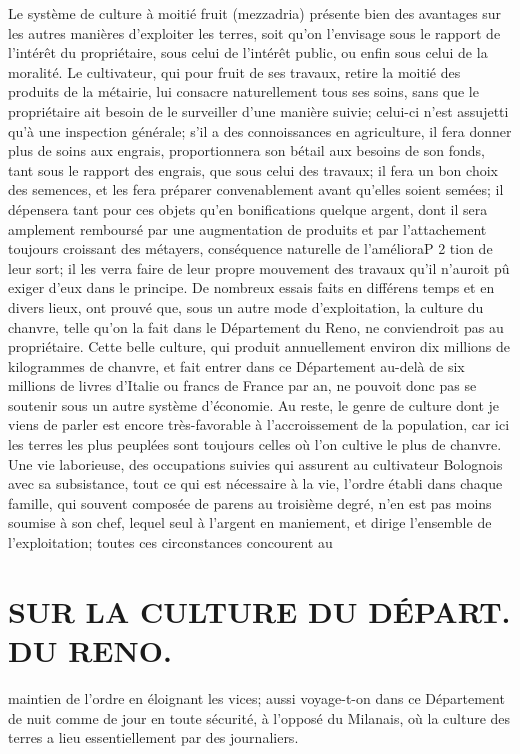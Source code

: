 Le système de culture à moitié fruit (mezzadria) présente bien des avantages sur les autres manières d'exploiter les terres, soit qu'on l'envisage sous le rapport de l'intérêt du propriétaire, sous celui de l'intérêt public, ou enfin sous celui de la moralité.
Le cultivateur, qui pour fruit de ses travaux, retire la moitié des produits de la métairie, lui consacre naturellement tous ses soins, sans que le propriétaire ait besoin de le surveiller d'une manière suivie; celui-ci n'est assujetti qu'à une inspection générale; s'il a des connoissances en agriculture, il fera donner plus de soins aux engrais, proportionnera son bétail aux besoins de son fonds, tant sous le rapport des engrais, que sous celui des travaux; il fera un bon choix des semences, et les fera préparer convenablement avant qu'elles soient semées; il dépensera tant pour ces objets qu'en bonifications quelque argent, dont il sera amplement remboursé par une augmentation de produits et par l'attachement toujours croissant des métayers, conséquence naturelle de l'amélioraP 2\setcounter{page}{180} tion de leur sort; il les verra faire de leur propre mouvement des travaux qu'il n'auroit pû exiger d'eux dans le principe.
De nombreux essais faits en différens temps et en divers lieux, ont prouvé que, sous un autre mode d'exploitation, la culture du chanvre, telle qu'on la fait dans le Département du Reno, ne conviendroit pas au propriétaire. Cette belle culture, qui produit annuellement environ dix millions de kilogrammes de chanvre, et fait entrer dans ce Département au-delà de six millions de livres d'Italie ou francs de France par an, ne pouvoit donc pas se soutenir sous un autre système d'économie. Au reste, le genre de culture dont je viens de parler est encore très-favorable à l'accroissement de la population, car ici les terres les plus peuplées sont toujours celles où l'on cultive le plus de chanvre.
Une vie laborieuse, des occupations suivies qui assurent au cultivateur Bolognois avec sa subsistance, tout ce qui est nécessaire à la vie, l'ordre établi dans chaque famille, qui souvent composée de parens au troisième degré, n'en est pas moins soumise à son chef, lequel seul à l'argent en maniement, et dirige l'ensemble de l'exploitation; toutes ces circonstances concourent au\setcounter{page}{181} \section{SUR LA CULTURE DU DÉPART. DU RENO.}
maintien de l'ordre en éloignant les vices; aussi voyage-t-on dans ce Département de nuit comme de jour en toute sécurité, à l'opposé du Milanais, où la culture des terres a lieu essentiellement par des journaliers.
